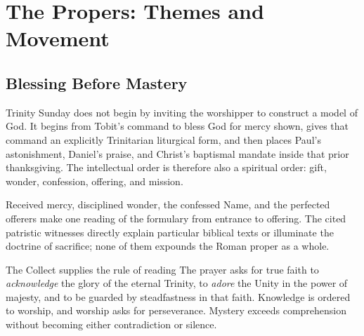 \section*{The Propers: Themes and Movement}

\subsection*{Blessing Before Mastery\enspace{}}

Trinity Sunday does not begin by inviting the worshipper to construct a model of God. It begins from Tobit's command to bless God for mercy shown, gives that command an explicitly Trinitarian liturgical form, and then places Paul's astonishment, Daniel's praise, and Christ's baptismal mandate inside that prior thanksgiving. The intellectual order is therefore also a spiritual order: gift, wonder, confession, offering, and mission.

\begin{center}
\end{center}

\noindent Received mercy, disciplined wonder, the confessed Name, and the perfected offerers make one reading of the formulary from entrance to offering. The cited patristic witnesses directly explain particular biblical texts or illuminate the doctrine of sacrifice; none of them expounds the Roman proper as a whole.

\begin{massbox}{The Collect supplies the rule of reading}
The prayer asks for true faith to \emph{acknowledge} the glory of the eternal Trinity, to \emph{adore} the Unity in the power of majesty, and to be guarded by steadfastness in that faith. Knowledge is ordered to worship, and worship asks for perseverance. Mystery exceeds comprehension without becoming either contradiction or silence.
\end{massbox}

